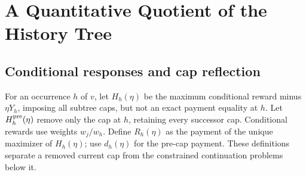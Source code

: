 \section{A Quantitative Quotient of the History Tree}\label{sec:quotient}
\subsection{Conditional responses and cap reflection}
For an occurrence $h$ of $v$, let $H_h(\eta)$ be the maximum conditional reward minus $\eta Y_h$, imposing all subtree caps, but not an exact payment equality at $h$. Let $H_h^{\rm pre}(\eta)$ remove only the cap at $h$, retaining every successor cap. Conditional rewards use weights $w_j/w_h$. Define $R_h(\eta)$ as the payment of the unique maximizer of $H_h(\eta)$; use $d_h(\eta)$ for the pre-cap payment. These definitions separate a removed current cap from the constrained continuation problems below it.


